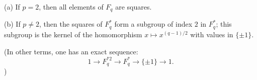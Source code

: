 (a) If $p = 2$, then all elements of $F_q$ are squares.

(b) If $p \neq 2$, then the squares of $F_q^*$ form a subgroup of index $2$ in $F_q^*$; this subgroup is the kernel of the homomorphism $x \mapsto x^{(q-1)/2}$ with values in $\{\pm 1\}$.

(In other terms, one has an exact sequence:
$$1 \rightarrow F_q^{*2} \rightarrow F_q^* \rightarrow \{\pm 1\} \rightarrow 1.$$)

